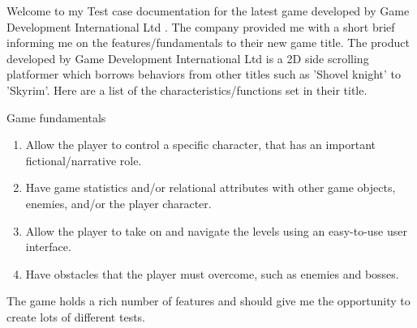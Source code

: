 Welcome to my Test case documentation for the latest game developed by Game Development International Ltd .
The company provided me with a short brief informing me on the features/fundamentals to their new game title.
The product developed by  Game Development International Ltd is a 2D side scrolling platformer which borrows
behaviors from other titles such as 'Shovel knight' to 'Skyrim'. Here are a list of the characteristics/functions
set in their title.

\centerline{Game fundamentals}

\begin{enumerate}
  \item Allow the player to control a specific character, that has an important
fictional/narrative role.
  \item Have game statistics and/or relational attributes with other game objects, enemies,
and/or the player character.

\item Allow the player to take on and navigate the levels using an easy-to-use user
interface.

\item Have obstacles that the player must overcome, such as enemies and bosses.
\end{enumerate}

The game holds a rich number of features and should give me the opportunity to create lots of different tests.
